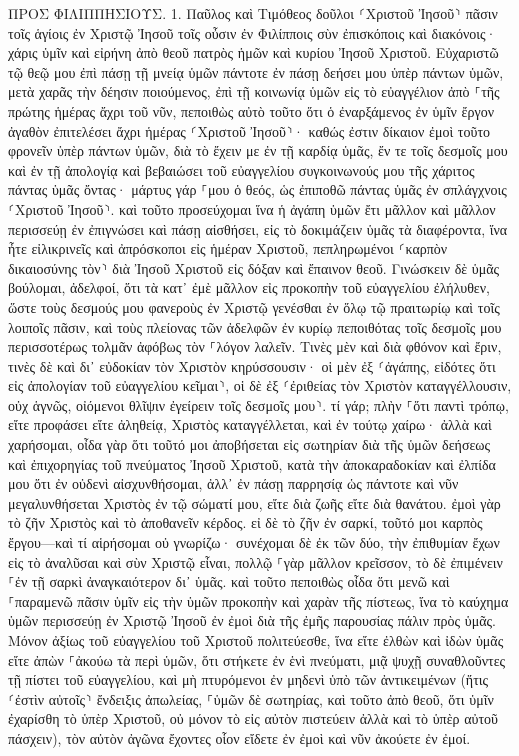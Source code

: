 \documentclass[twoside, 9pt]{extreport}
\begin{document}
ΠΡΟΣ ΦΙΛΙΠΠΗΣΙΟΥΣ.
1.
Παῦλος καὶ Τιμόθεος δοῦλοι ⸂Χριστοῦ Ἰησοῦ⸃ πᾶσιν τοῖς ἁγίοις ἐν Χριστῷ Ἰησοῦ τοῖς οὖσιν ἐν Φιλίπποις σὺν ἐπισκόποις καὶ διακόνοις· 
χάρις ὑμῖν καὶ εἰρήνη ἀπὸ θεοῦ πατρὸς ἡμῶν καὶ κυρίου Ἰησοῦ Χριστοῦ. 
Εὐχαριστῶ τῷ θεῷ μου ἐπὶ πάσῃ τῇ μνείᾳ ὑμῶν 
πάντοτε ἐν πάσῃ δεήσει μου ὑπὲρ πάντων ὑμῶν, μετὰ χαρᾶς τὴν δέησιν ποιούμενος, 
ἐπὶ τῇ κοινωνίᾳ ὑμῶν εἰς τὸ εὐαγγέλιον ἀπὸ ⸀τῆς πρώτης ἡμέρας ἄχρι τοῦ νῦν, 
πεποιθὼς αὐτὸ τοῦτο ὅτι ὁ ἐναρξάμενος ἐν ὑμῖν ἔργον ἀγαθὸν ἐπιτελέσει ἄχρι ἡμέρας ⸂Χριστοῦ Ἰησοῦ⸃· 
καθώς ἐστιν δίκαιον ἐμοὶ τοῦτο φρονεῖν ὑπὲρ πάντων ὑμῶν, διὰ τὸ ἔχειν με ἐν τῇ καρδίᾳ ὑμᾶς, ἔν τε τοῖς δεσμοῖς μου καὶ ἐν τῇ ἀπολογίᾳ καὶ βεβαιώσει τοῦ εὐαγγελίου συγκοινωνούς μου τῆς χάριτος πάντας ὑμᾶς ὄντας· 
μάρτυς γάρ ⸀μου ὁ θεός, ὡς ἐπιποθῶ πάντας ὑμᾶς ἐν σπλάγχνοις ⸂Χριστοῦ Ἰησοῦ⸃. 
καὶ τοῦτο προσεύχομαι ἵνα ἡ ἀγάπη ὑμῶν ἔτι μᾶλλον καὶ μᾶλλον περισσεύῃ ἐν ἐπιγνώσει καὶ πάσῃ αἰσθήσει, 
εἰς τὸ δοκιμάζειν ὑμᾶς τὰ διαφέροντα, ἵνα ἦτε εἰλικρινεῖς καὶ ἀπρόσκοποι εἰς ἡμέραν Χριστοῦ, 
πεπληρωμένοι ⸂καρπὸν δικαιοσύνης τὸν⸃ διὰ Ἰησοῦ Χριστοῦ εἰς δόξαν καὶ ἔπαινον θεοῦ. 
Γινώσκειν δὲ ὑμᾶς βούλομαι, ἀδελφοί, ὅτι τὰ κατ᾽ ἐμὲ μᾶλλον εἰς προκοπὴν τοῦ εὐαγγελίου ἐλήλυθεν, 
ὥστε τοὺς δεσμούς μου φανεροὺς ἐν Χριστῷ γενέσθαι ἐν ὅλῳ τῷ πραιτωρίῳ καὶ τοῖς λοιποῖς πᾶσιν, 
καὶ τοὺς πλείονας τῶν ἀδελφῶν ἐν κυρίῳ πεποιθότας τοῖς δεσμοῖς μου περισσοτέρως τολμᾶν ἀφόβως τὸν ⸀λόγον λαλεῖν. 
Τινὲς μὲν καὶ διὰ φθόνον καὶ ἔριν, τινὲς δὲ καὶ δι᾽ εὐδοκίαν τὸν Χριστὸν κηρύσσουσιν· 
οἱ μὲν ἐξ ⸂ἀγάπης, εἰδότες ὅτι εἰς ἀπολογίαν τοῦ εὐαγγελίου κεῖμαι⸃, 
οἱ δὲ ἐξ ⸂ἐριθείας τὸν Χριστὸν καταγγέλλουσιν, οὐχ ἁγνῶς, οἰόμενοι θλῖψιν ἐγείρειν τοῖς δεσμοῖς μου⸃. 
τί γάρ; πλὴν ⸀ὅτι παντὶ τρόπῳ, εἴτε προφάσει εἴτε ἀληθείᾳ, Χριστὸς καταγγέλλεται, καὶ ἐν τούτῳ χαίρω· ἀλλὰ καὶ χαρήσομαι, 
οἶδα γὰρ ὅτι τοῦτό μοι ἀποβήσεται εἰς σωτηρίαν διὰ τῆς ὑμῶν δεήσεως καὶ ἐπιχορηγίας τοῦ πνεύματος Ἰησοῦ Χριστοῦ, 
κατὰ τὴν ἀποκαραδοκίαν καὶ ἐλπίδα μου ὅτι ἐν οὐδενὶ αἰσχυνθήσομαι, ἀλλ᾽ ἐν πάσῃ παρρησίᾳ ὡς πάντοτε καὶ νῦν μεγαλυνθήσεται Χριστὸς ἐν τῷ σώματί μου, εἴτε διὰ ζωῆς εἴτε διὰ θανάτου. 
ἐμοὶ γὰρ τὸ ζῆν Χριστὸς καὶ τὸ ἀποθανεῖν κέρδος. 
εἰ δὲ τὸ ζῆν ἐν σαρκί, τοῦτό μοι καρπὸς ἔργου—καὶ τί αἱρήσομαι οὐ γνωρίζω· 
συνέχομαι δὲ ἐκ τῶν δύο, τὴν ἐπιθυμίαν ἔχων εἰς τὸ ἀναλῦσαι καὶ σὺν Χριστῷ εἶναι, πολλῷ ⸀γὰρ μᾶλλον κρεῖσσον, 
τὸ δὲ ἐπιμένειν ⸀ἐν τῇ σαρκὶ ἀναγκαιότερον δι᾽ ὑμᾶς. 
καὶ τοῦτο πεποιθὼς οἶδα ὅτι μενῶ καὶ ⸀παραμενῶ πᾶσιν ὑμῖν εἰς τὴν ὑμῶν προκοπὴν καὶ χαρὰν τῆς πίστεως, 
ἵνα τὸ καύχημα ὑμῶν περισσεύῃ ἐν Χριστῷ Ἰησοῦ ἐν ἐμοὶ διὰ τῆς ἐμῆς παρουσίας πάλιν πρὸς ὑμᾶς. 
Μόνον ἀξίως τοῦ εὐαγγελίου τοῦ Χριστοῦ πολιτεύεσθε, ἵνα εἴτε ἐλθὼν καὶ ἰδὼν ὑμᾶς εἴτε ἀπὼν ⸀ἀκούω τὰ περὶ ὑμῶν, ὅτι στήκετε ἐν ἑνὶ πνεύματι, μιᾷ ψυχῇ συναθλοῦντες τῇ πίστει τοῦ εὐαγγελίου, 
καὶ μὴ πτυρόμενοι ἐν μηδενὶ ὑπὸ τῶν ἀντικειμένων (ἥτις ⸂ἐστὶν αὐτοῖς⸃ ἔνδειξις ἀπωλείας, ⸀ὑμῶν δὲ σωτηρίας, καὶ τοῦτο ἀπὸ θεοῦ, 
ὅτι ὑμῖν ἐχαρίσθη τὸ ὑπὲρ Χριστοῦ, οὐ μόνον τὸ εἰς αὐτὸν πιστεύειν ἀλλὰ καὶ τὸ ὑπὲρ αὐτοῦ πάσχειν), 
τὸν αὐτὸν ἀγῶνα ἔχοντες οἷον εἴδετε ἐν ἐμοὶ καὶ νῦν ἀκούετε ἐν ἐμοί. 
\end{document}
